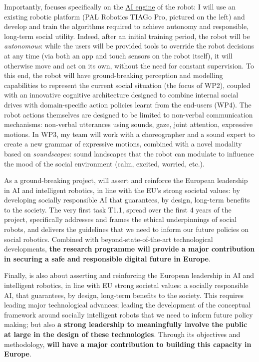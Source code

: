 Importantly, \project focuses specifically on the \ul{AI engine} of the robot: I
will use an existing robotic platform (PAL Robotics TIAGo Pro, pictured on the left) and
develop and train the algorithms required to achieve autonomy and responsible,
long-term social utility. Indeed, after an initial training period, the robot
will be \emph{autonomous}: while the users will be provided tools to override
the robot decisions at any time (via both an app and touch sensors on the robot
itself), it will otherwise move and act on its own, without the need for
constant supervision. To this end, the robot will have ground-breaking
perception and modelling capabilities to represent the current social situation
(the focus of WP2), coupled with an innovative cognitive architecture designed
to combine internal social drives with domain-specific action policies learnt
from the end-users (WP4). The robot actions themselves are designed to be
limited to non-verbal communication mechanisms: non-verbal utterances using
sounds, gaze, joint attention, expressive motions. In WP3, my team will work
with a choreographer and a sound expert to create a new grammar of expressive
motions, combined with a novel modality based on \emph{soundscapes}: sound
landscapes that the robot can modulate to influence the mood of the social
environment (calm, excited, worried, etc.).

As a ground-breaking project, \project will assert and reinforce the European leadership in AI and
intelligent robotics, in line with the EU's strong societal values: by developing
socially responsible AI that guarantees, by design, long-term benefits to the
society. The very first task T1.1, spread over the first 4 years of the project,
specifically addresses and frames the ethical underpinnings of social robots,
and delivers the guidelines that we need to inform our future policies on social
robotics. Combined with beyond-state-of-the-art technological developments,
\textbf{the \project research programme will provide a major contribution in
securing a safe and responsible digital future in Europe}. 

Finally, \project is also about asserting and reinforcing the European
leadership in AI and intelligent robotics, in line with EU strong societal
values: a socially responsible AI, that guarantees, by design, long-term
benefits to the society. This requires leading major technological advances;
leading the development of the conceptual framework around socially intelligent
robots that we need to inform future policy making; but also \textbf{a strong
leadership to meaningfully involve the public at large in the design of these
technologies}. Through its objectives and methodology, \textbf{\project will
have a major contribution to building this capacity in Europe}. 



